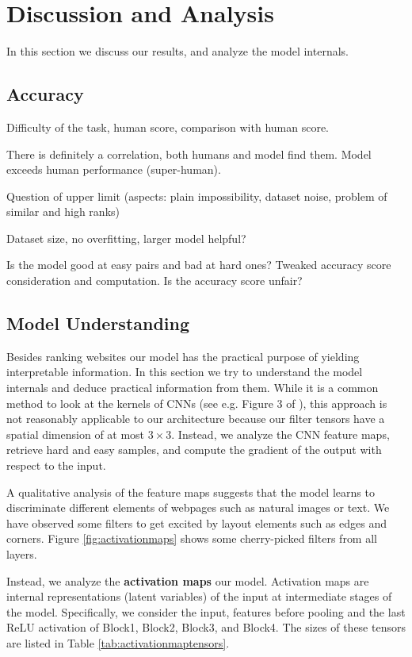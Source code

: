 \section{Discussion and Analysis}

In this section we discuss our results, and analyze the model internals.

\subsection{Accuracy}

Difficulty of the task, human score, comparison with human score.

There is definitely a correlation, both humans and model find them. Model exceeds human performance (super-human).

Question of upper limit (aspects: plain impossibility, dataset noise, problem of similar and high ranks)

Dataset size, no overfitting, larger model helpful?

Is the model good at easy pairs and bad at hard ones? Tweaked accuracy score consideration and computation. Is the accuracy score unfair?

\subsection{Model Understanding}

Besides ranking websites our model has the practical purpose of yielding interpretable information. In this section we try to understand the model internals and deduce practical information from them. While it is a common method to look at the kernels of CNNs (see e.g. Figure 3 of \cite{krizhevsky:imagenet}), this approach is not reasonably applicable to our architecture because our filter tensors have a spatial dimension of at most $3\times3$. Instead, we analyze the CNN feature maps, retrieve hard and easy samples, and compute the gradient of the output with respect to the input.

A qualitative analysis of the feature maps suggests that the model learns to discriminate different elements of webpages such as natural images or text. We have observed some filters to get excited by layout elements such as edges and corners. Figure \ref{fig:activationmaps} shows some cherry-picked filters from all layers.

Instead, we analyze the \textbf{activation maps} our model. Activation maps are internal representations (latent variables) of the input at intermediate stages of the model. Specifically, we consider the input, features before pooling and the last ReLU activation of Block1, Block2, Block3, and Block4. The sizes of these tensors are listed in Table \ref{tab:activationmaptensors}.

